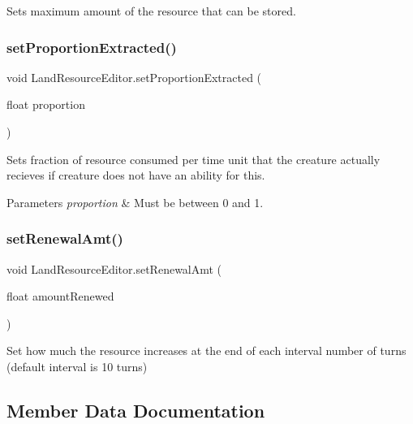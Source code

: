 Sets maximum amount of the resource that can be stored. 

\mbox{\label{class_land_resource_editor_a2b401ce42af2c51063542978f500ccc1}} 
\subsubsection{\texorpdfstring{set\+Proportion\+Extracted()}{setProportionExtracted()}}
{\footnotesize\ttfamily void Land\+Resource\+Editor.\+set\+Proportion\+Extracted (\begin{DoxyParamCaption}\item[{float}]{proportion }\end{DoxyParamCaption})}



Sets fraction of resource consumed per time unit that the creature actually recieves if creature does not have an ability for this. 


\begin{DoxyParams}{Parameters}
{\em proportion} & Must be between 0 and 1.\\
\hline
\end{DoxyParams}
\mbox{\label{class_land_resource_editor_a78ac1e33157301f579816da8fe86b8a1}} 
\subsubsection{\texorpdfstring{set\+Renewal\+Amt()}{setRenewalAmt()}}
{\footnotesize\ttfamily void Land\+Resource\+Editor.\+set\+Renewal\+Amt (\begin{DoxyParamCaption}\item[{float}]{amount\+Renewed }\end{DoxyParamCaption})}



Set how much the resource increases at the end of each interval number of turns (default interval is 10 turns) 



\subsection{Member Data Documentation}
\mbox{\label{class_land_resource_editor_a5cde04313d283beee5f340a056b75bc2}} 
